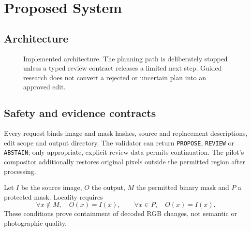 \chapter{Proposed System}
\label{ch:system}
\section{Architecture}
\begin{figure}[htbp]
\centering
{}
\caption{Implemented architecture. The planning path is deliberately stopped unless a typed review contract releases a limited next step. Guided research does not convert a rejected or uncertain plan into an approved edit.}
\label{fig:architecture}
\end{figure}

\section{Safety and evidence contracts}
Every request binds image and mask hashes, source and replacement descriptions, edit scope and output directory. The validator can return \texttt{PROPOSE}, \texttt{REVIEW} or \texttt{ABSTAIN}; only appropriate, explicit review data permits continuation. The pilot's compositor additionally restores original pixels outside the permitted region after processing.

Let $I$ be the source image, $O$ the output, $M$ the permitted binary mask and $P$ a protected mask. Locality requires
\[
\forall x\notin M,\quad O(x)=I(x), \qquad \forall x\in P,\quad O(x)=I(x).
\]
These conditions prove containment of decoded RGB changes, not semantic or photographic quality.

